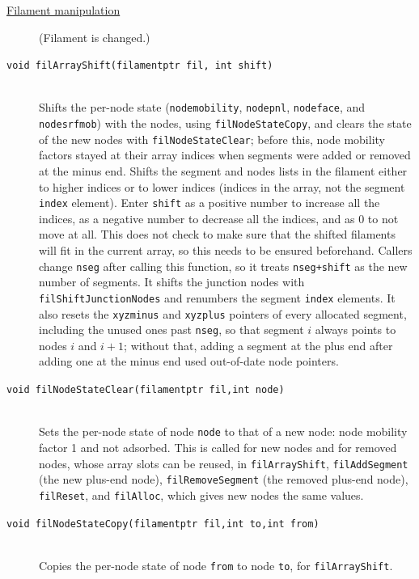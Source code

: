 \documentclass {scrbook}
\newcommand {\ttt} {\texttt}
\begin{document}
\begin{description}
\item[\underline{Filament manipulation}]
(Filament is changed.)

\item[\ttt{void filArrayShift(filamentptr fil, int shift)}]
\hfill \\
Shifts the per-node state (\ttt{nodemobility}, \ttt{nodepnl}, \ttt{nodeface}, and \ttt{nodesrfmob}) with the nodes, using \ttt{filNodeStateCopy}, and clears the state of the new nodes with \ttt{filNodeStateClear}; before this, node mobility factors stayed at their array indices when segments were added or removed at the minus end. Shifts the segment and nodes lists in the filament either to higher indices or to lower indices (indices in the array, not the segment \ttt{index} element). Enter \ttt{shift} as a positive number to increase all the indices, as a negative number to decrease all the indices, and as 0 to not move at all. This does not check to make sure that the shifted filaments will fit in the current array, so this needs to be ensured beforehand. Callers change \ttt{nseg} after calling this function, so it treats \ttt{nseg+shift} as the new number of segments. It shifts the junction nodes with \ttt{filShiftJunctionNodes} and renumbers the segment \ttt{index} elements. It also resets the \ttt{xyzminus} and \ttt{xyzplus} pointers of every allocated segment, including the unused ones past \ttt{nseg}, so that segment $i$ always points to nodes $i$ and $i+1$; without that, adding a segment at the plus end after adding one at the minus end used out-of-date node pointers. %

\item[\ttt{void filNodeStateClear(filamentptr fil,int node)}] %
\hfill \\
Sets the per-node state of node \ttt{node} to that of a new node: node mobility factor 1 and not adsorbed. This is called for new nodes and for removed nodes, whose array slots can be reused, in \ttt{filArrayShift}, \ttt{filAddSegment} (the new plus-end node), \ttt{filRemoveSegment} (the removed plus-end node), \ttt{filReset}, and \ttt{filAlloc}, which gives new nodes the same values.

\item[\ttt{void filNodeStateCopy(filamentptr fil,int to,int from)}] %
\hfill \\
Copies the per-node state of node \ttt{from} to node \ttt{to}, for \ttt{filArrayShift}.


\end{description}
\end{document}
